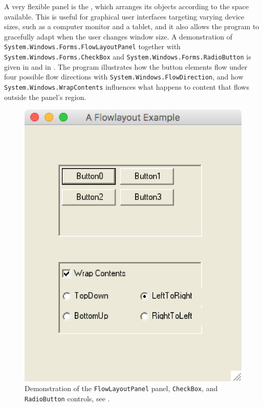 \documentclass[fsharpnotes.tex]{subfiles}
\begin{document}
A very flexible panel is the , which arranges its objects according to the space available. This is useful for graphical user interfaces targeting varying device sizes, such as a computer monitor and a tablet, and it also allows the program to gracefully adapt when the user changes window size. A demonstration of \lstinline{System.Windows.Forms.FlowLayoutPanel} together with \lstinline{System.Windows.Forms.CheckBox} and \lstinline{System.Windows.Forms.RadioButton} is given in  and in . The program illustrates how the button elements flow under four possible flow directions with \lstinline{System.Windows.FlowDirection}, and how \lstinline{System.Windows.WrapContents} influences what happens to content that flows outside the panel's region. 
%
%
%
\begin{figure}
  \centering
  \includegraphics[scale=0.3]{flowLayoutPanel}
  \caption{Demonstration of the \lstinline!FlowLayoutPanel! panel, \lstinline!CheckBox!, and \lstinline!RadioButton! controls, see .}
  \label{fig:flowLayoutPanel}
\end{figure}
\end{document}
